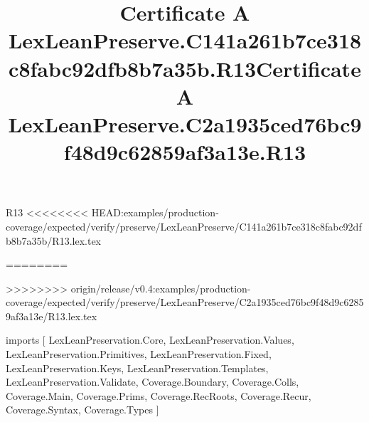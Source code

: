 \begin{lexlean}{R13}
<<<<<<<< HEAD:examples/production-coverage/expected/verify/preserve/LexLeanPreserve/C141a261b7ce318c8fabc92dfb8b7a35b/R13.lex.tex
\title{Certificate A LexLeanPreserve.C141a261b7ce318c8fabc92dfb8b7a35b.R13}
========
\title{Certificate A LexLeanPreserve.C2a1935ced76bc9f48d9c62859af3a13e.R13}
>>>>>>>> origin/release/v0.4:examples/production-coverage/expected/verify/preserve/LexLeanPreserve/C2a1935ced76bc9f48d9c62859af3a13e/R13.lex.tex
\begin{coremodule}
imports [
  LexLeanPreservation.Core,
  LexLeanPreservation.Values,
  LexLeanPreservation.Primitives,
  LexLeanPreservation.Fixed,
  LexLeanPreservation.Keys,
  LexLeanPreservation.Templates,
  LexLeanPreservation.Validate,
  Coverage.Boundary,
  Coverage.Colls,
  Coverage.Main,
  Coverage.Prims,
  Coverage.RecRoots,
  Coverage.Recur,
  Coverage.Syntax,
  Coverage.Types
]


\end{coremodule}
\end{lexlean}
